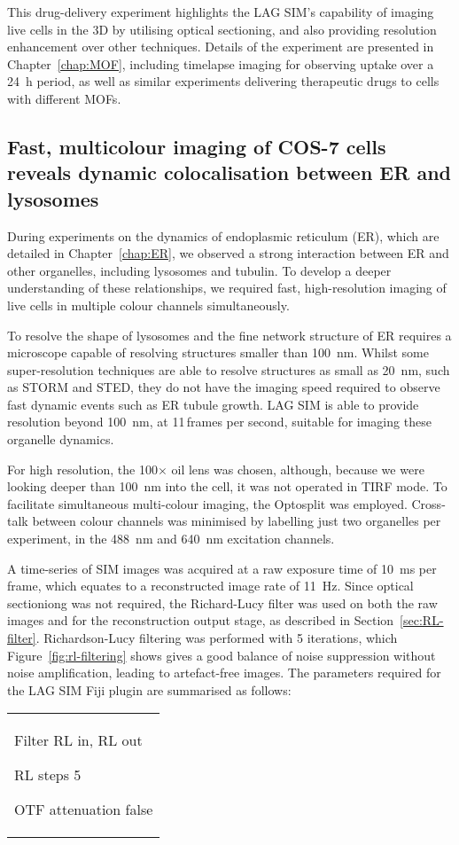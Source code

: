 This drug-delivery experiment highlights the LAG SIM's capability of imaging live cells in the 3D by utilising optical sectioning, and also providing resolution enhancement over other techniques. 
Details of the experiment are presented in Chapter~\ref{chap:MOF}, including timelapse imaging for observing uptake over a \SI{24}{\hour} period, as well as similar experiments delivering therapeutic drugs to cells with different MOFs. 

\subsection{Fast, multicolour imaging of COS-7 cells reveals dynamic colocalisation between ER and lysosomes}
During experiments on the dynamics of endoplasmic reticulum (ER), which are detailed in Chapter~\ref{chap:ER}, we observed a strong interaction between ER and other organelles, including lysosomes and tubulin. 
To develop a deeper understanding of these relationships, we required fast, high-resolution imaging of live cells in multiple colour channels simultaneously. 

To resolve the shape of lysosomes and the fine network structure of ER requires a microscope capable of resolving structures smaller than \SI{100}{\nano\metre}. 
Whilst some super-resolution techniques are able to resolve structures as small as \SI{20}{\nano\metre}, such as STORM and STED, they do not have the imaging speed required to observe fast dynamic events such as ER tubule growth. 
LAG SIM is able to provide resolution beyond \SI{100}{\nano\metre}, at 11\,frames per second, suitable for imaging these organelle dynamics. 

For high resolution, the 100$\times$ oil lens was chosen, although, because we were looking deeper than \SI{100}{\nano\metre} into the cell, it was not operated in TIRF mode. 
To facilitate simultaneous multi-colour imaging, the Optosplit was employed. 
Cross-talk between colour channels was minimised by labelling just two organelles per experiment, in the \SI{488}{\nano\metre} and \SI{640}{\nano\metre} excitation channels. 

A time-series of SIM images was acquired at a raw exposure time of \SI{10}{\milli\second} per frame, which equates to a reconstructed image rate of \SI{11}{\hertz}. 
Since optical sectioniong was not required, the Richard-Lucy filter was used on both the raw images and for the reconstruction output stage, as described in Section~\ref{sec:RL-filter}. 
Richardson-Lucy filtering was performed with 5 iterations, which Figure~\ref{fig:rl-filtering} shows gives a good balance of noise suppression without noise amplification, leading to artefact-free images. 
The parameters required for the LAG SIM Fiji plugin are summarised as follows:
\newline
\begin{tabular}{p{}}
\begin{labelling}[margin=OTF attenuation]
	\item[Filter] RL in, RL out
	\item[RL steps] 5
	\item[OTF attenuation] false
\end{labelling}
\end{tabular}

